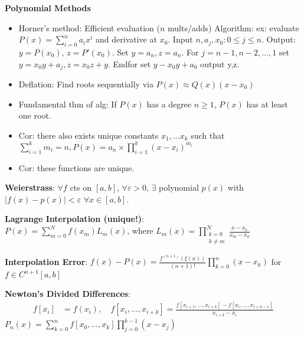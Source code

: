 \documentclass{article}
\begin{document}
\begin{minipage}[t]{0.49\textwidth}
\textbf{Polynomial Methods}
\begin{itemize}
  \item Horner's method: Efficient evaluation ($n$ mults/adds) Algorithm: ex: evaluate $P(x)=\sum^{n}_{i=0}a_ix^i$ and derivative at $x_0$. Input $n,a_j, x_0: 0\le j\le n$. Output: $y=P(x_0)$, $z=P'(x_0)$. Set $y=a_n, z=a_n$. For $j=n-1,n-2,...,1$ set $y=x_0y+a_j,z=x_0z+y$. Endfor set $y-x_0y+a_0$ output y,z.  
    \item Deflation: Find roots sequentially via $P(x)\approx Q(x)(x-x_0)$
    \item Fundamental thm of alg: If $P(x)$ has a degree $n\ge 1$, $P(x)$ has at least one root.
    \item Cor: there also exists unique constants $x_1, ... x_k$ such that\\
    $\sum_{i=1}^{k}m_i=n, P(x)=a_n \times \prod_{i=1}^{k}(x-x_i)^{m_i}$
    \item Cor: these functions are unique.
\end{itemize}
\textbf{Weierstrass}: $\forall f$ cts on $[a,b]$, $\forall \varepsilon>0$, $\exists$ polynomial $p(x)$ with $|f(x)-p(x)|<\varepsilon$ $\forall x \in [a,b]$.

  \textbf{Lagrange Interpolation (unique!)}:\\ $P(x) = \sum_{m=0}^N f(x_m) L_m(x)$, where $L_m(x) = \prod_{\substack{k=0\\k\neq m}}^N \frac{x-x_k}{x_m-x_k}$

\textbf{Interpolation Error}: $f(x)-P(x) = \frac{f^{(n+1)}(\xi(x))}{(n+1)!} \prod_{k=0}^n (x-x_k)$ for $f\in C^{n+1}[a,b]$

\textbf{Newton's Divided Differences}:
\begin{align*}
f[x_i] &= f(x_i),\quad f[x_i,\dots,x_{i+k}] = \frac{f[x_{i+1},\dots,x_{i+k}] - f[x_i,\dots,x_{i+k-1}]}{x_{i+k}-x_i}
\end{align*}
$P_n(x) = \sum_{k=0}^n f[x_0,\dots,x_k] \prod_{j=0}^{k-1} (x-x_j)$


\end{minipage}
\end{document}
